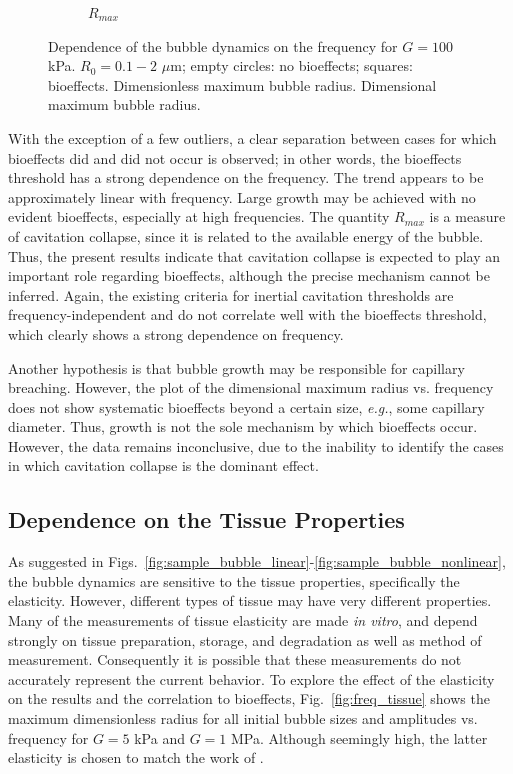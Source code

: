 \begin{figure}[t]
\begin{subfigure}{0.47\textwidth}
    \caption[Dependence of maximum dimensional bubble radius on pulse frequency]{$R_{max}$}
    \label{fig:usbe_bubble_dradius_frequency}
  \end{subfigure}  
  \caption{Dependence of the bubble dynamics on the frequency for
    $G=100$ kPa. $R_0=0.1-2$ $\mu$m; empty circles: no bioeffects;
    squares: bioeffects. 
    Dimensionless maximum bubble
    radius.  Dimensional
    maximum bubble radius.}
  \label{fig:freq}
\end{figure}

With the exception of a few outliers, a clear separation between cases
for which bioeffects did and did not occur is observed; in other
words, the bioeffects threshold has a strong dependence on the
frequency. The trend appears to be approximately linear with
frequency. Large growth may be achieved with no evident bioeffects,
especially at high frequencies. The quantity $R_{max}$ is a
measure of cavitation collapse, since it is related to the available
energy of the bubble. Thus, the present results indicate that
cavitation collapse is expected to play an important role regarding
bioeffects, although the precise mechanism cannot be inferred.  Again,
the existing criteria for inertial cavitation thresholds are
frequency-independent and do not correlate well with the bioeffects
threshold, which clearly shows a strong dependence on frequency.

Another hypothesis is that bubble growth may be responsible for
capillary breaching. However, the plot of the dimensional maximum
radius vs. frequency does not show systematic bioeffects beyond a
certain size, \emph{e.g.}, some capillary diameter. Thus, growth is
not the sole mechanism by which bioeffects occur. However, the data
remains inconclusive, due to the inability to identify the cases in
which cavitation collapse is the dominant effect.






\subsection{Dependence on the Tissue Properties}
\label{sec:usbe_bubble_tissue_properties}

As suggested in
Figs.~\ref{fig:sample_bubble_linear}-\ref{fig:sample_bubble_nonlinear},
the bubble dynamics are sensitive to the tissue properties,
specifically the elasticity. However, different types of tissue may
have very different properties. Many of the measurements of tissue elasticity are made
\emph{in vitro}, and depend strongly on tissue preparation, storage,
and degradation as well as method of measurement.  Consequently it is
possible that these measurements do not accurately represent the
current behavior.  To explore the effect of the elasticity on the
results and the correlation to bioeffects, Fig.~\ref{fig:freq_tissue}
shows the maximum dimensionless radius for all initial bubble sizes
and amplitudes vs. frequency for $G=5$ kPa and $G=1$ MPa. Although
seemingly high, the latter elasticity is chosen to match the work of
\cite{Yang2005}.

